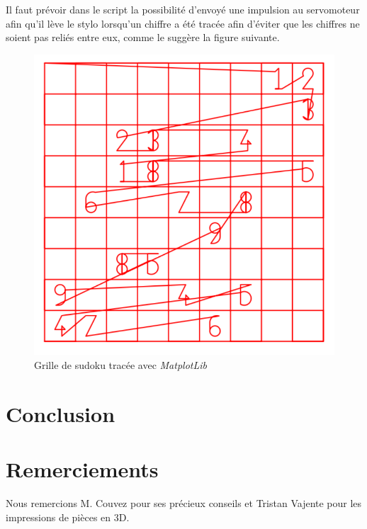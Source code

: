 \documentclass[12pt,a4paper]{report}
\begin{document}
Il faut prévoir dans le script la possibilité d'envoyé une impulsion au servomoteur afin qu'il lève le stylo lorsqu'un chiffre a été tracée afin d'éviter que les chiffres ne soient pas reliés entre eux, comme le suggère la figure suivante.

\begin{figure}[!h]
 \center
 \includegraphics[scale=0.5]{../pictures/Sudoku_relies}
 \caption{Grille de sudoku tracée avec \emph{MatplotLib}}
\end{figure}

\chapter*{Conclusion}

\chapter*{Remerciements}

Nous remercions M. Couvez pour ses précieux conseils et Tristan Vajente pour les impressions de pièces en 3D.


\end{document}
